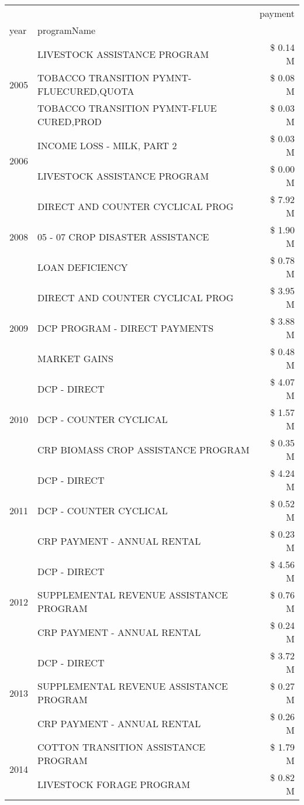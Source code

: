 \begin{tabular}{llr}
\toprule
 &  & payment \\
year & programName &  \\
\midrule
\multirow[t]{3}{*}{2005} & LIVESTOCK ASSISTANCE PROGRAM & \$ 0.14 M \\
 & TOBACCO TRANSITION PYMNT-FLUECURED,QUOTA & \$ 0.08 M \\
 & TOBACCO TRANSITION PYMNT-FLUE CURED,PROD & \$ 0.03 M \\
\cline{1-3}
\multirow[t]{2}{*}{2006} & INCOME LOSS - MILK, PART 2 & \$ 0.03 M \\
 & LIVESTOCK ASSISTANCE PROGRAM & \$ 0.00 M \\
\cline{1-3}
\multirow[t]{3}{*}{2008} & DIRECT AND COUNTER CYCLICAL PROG & \$ 7.92 M \\
 & 05 - 07 CROP DISASTER ASSISTANCE & \$ 1.90 M \\
 & LOAN DEFICIENCY & \$ 0.78 M \\
\cline{1-3}
\multirow[t]{3}{*}{2009} & DIRECT AND COUNTER CYCLICAL PROG & \$ 3.95 M \\
 & DCP PROGRAM - DIRECT PAYMENTS & \$ 3.88 M \\
 & MARKET GAINS & \$ 0.48 M \\
\cline{1-3}
\multirow[t]{3}{*}{2010} & DCP - DIRECT & \$ 4.07 M \\
 & DCP - COUNTER CYCLICAL & \$ 1.57 M \\
 & CRP BIOMASS CROP ASSISTANCE PROGRAM & \$ 0.35 M \\
\cline{1-3}
\multirow[t]{3}{*}{2011} & DCP - DIRECT & \$ 4.24 M \\
 & DCP - COUNTER CYCLICAL & \$ 0.52 M \\
 & CRP PAYMENT - ANNUAL RENTAL & \$ 0.23 M \\
\cline{1-3}
\multirow[t]{3}{*}{2012} & DCP - DIRECT & \$ 4.56 M \\
 & SUPPLEMENTAL REVENUE ASSISTANCE PROGRAM & \$ 0.76 M \\
 & CRP PAYMENT - ANNUAL RENTAL & \$ 0.24 M \\
\cline{1-3}
\multirow[t]{3}{*}{2013} & DCP - DIRECT & \$ 3.72 M \\
 & SUPPLEMENTAL REVENUE ASSISTANCE PROGRAM & \$ 0.27 M \\
 & CRP PAYMENT - ANNUAL RENTAL & \$ 0.26 M \\
\cline{1-3}
\multirow[t]{3}{*}{2014} & COTTON TRANSITION ASSISTANCE PROGRAM & \$ 1.79 M \\
 & LIVESTOCK FORAGE PROGRAM & \$ 0.82 M \\

\end{tabular}
